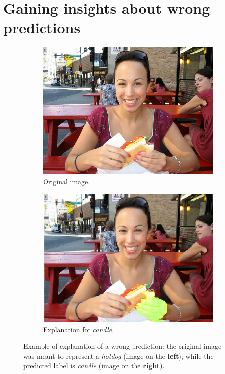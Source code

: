 \documentclass[12pt, twoside, a4paper]{report}
\begin{document}
\section{Gaining insights about wrong predictions}

\begin{figure}
\centering
\begin{subfigure}[b]{.49\linewidth}
\includegraphics[width=\linewidth]{images/insight-original.JPEG}
\caption{Original image.}
\label{subfig:insight_orig}
\end{subfigure}
\begin{subfigure}[b]{.49\linewidth}
\includegraphics[width=\linewidth]{images/insight-resized.png}
\caption{Explanation for \emph{candle}.}
\label{subfig:insight_exp}
\end{subfigure}
\caption{Example of explanation of a wrong prediction: the original image was meant to represent a \emph{hotdog} (image on the \textbf{left}), while the predicted label is \emph{candle} (image on the \textbf{right}).}
\label{fig:insight}
\end{figure}
\end{document}
